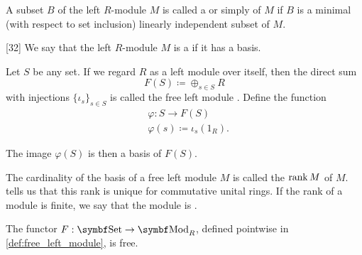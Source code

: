 \begin{definition}\label{def:left_module_hamel_basis}
  A subset \( B \) of the left \( R \)-module \( M \) is called a  or simply  of \( M \) if \( B \) is a minimal (with respect to set inclusion) linearly independent subset of \( M \).
\end{definition}

\begin{definition}\label{def:free_left_module}[32]\cite[377]{Knapp2016BAlg}
  We say that the left \( R \)-module \( M \) is a  if it has a basis.

  Let \( S \) be any set. If we regard \( R \) as a left module over itself, then the direct sum
  \begin{equation*}
    F(S) \coloneqq \oplus_{s \in S} R
  \end{equation*}
  with injections \( \{ \iota_s \}_{s \in S} \) is called the free left module . Define the function
  \begin{align*}
    &\varphi: S \to F(S) \\
    &\varphi(s) \coloneqq \iota_s(1_R).
  \end{align*}

  The image \( \varphi(S) \) is then a basis of \( F(S) \).

  The cardinality of the basis of a free left module \( M \) is called the  \( \operatorname{rank} M \) of \( M \).  tells us that this rank is unique for commutative unital rings. If the rank of a module is finite, we say that the module is .
\end{definition}

\begin{proposition}\label{thm:free_module_is_free_functor}
  The functor \( F: \Cat{Set} \to \Cat{Mod}_R \), defined pointwise in \cref{def:free_left_module}, is free.
\end{proposition}

